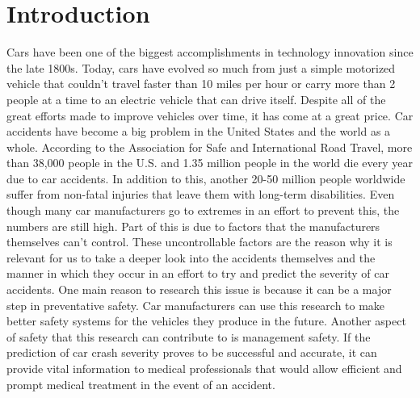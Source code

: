 \documentclass[conference]{IEEEtran}
\begin{document}
\section{Introduction}
Cars have been one of the biggest accomplishments in technology innovation since the late 1800s. Today, cars have evolved so much from just a simple motorized vehicle that couldn’t travel faster than 10 miles per hour or carry more than 2 people at a time to an electric vehicle that can drive itself. Despite all of the great efforts made to improve vehicles over time, it has come at a great price. Car accidents have become a big problem in the United States and the world as a whole. According to the Association for Safe and International Road Travel, more than 38,000 people in the U.S. and 1.35 million people in the world die every year due to car accidents\cite{noauthor_road_nodate}. In addition to this, another 20-50 million people worldwide suffer from non-fatal injuries that leave them with long-term disabilities. Even though many car manufacturers go to extremes in an effort to prevent this, the numbers are still high. Part of this is due to factors that the manufacturers themselves can’t control. These uncontrollable factors are the reason why it is relevant for us to take a deeper look into the accidents themselves and the manner in which they occur in an effort to try and predict the severity of car accidents. One main reason to research this issue is because it can be a major step in preventative safety. Car manufacturers can use this research to make better safety systems for the vehicles they produce in the future. Another aspect of safety that this research can contribute to is management safety. If the prediction of car crash severity proves to be  successful and accurate, it can provide vital information to medical professionals that would allow efficient and prompt medical treatment in the event of an accident.\\
\end{document}
